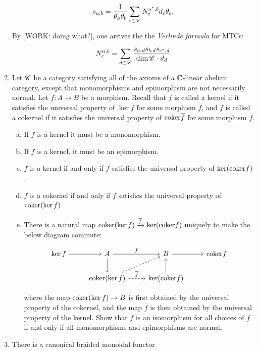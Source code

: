 \documentclass{article}
\theoremstyle{definition}
\numberwithin{figure}{section}
\begin{document}
\begin{enumerate}[\thesection .1.]
$$s_{a,b}=\frac{1}{\theta_a \theta_b}\sum_{c\in \mathscr{L}}N^{a^*,b}_{c}d_{c}\theta_{c}.$$

By [WORK: doing what?], one arrives the the \textit{Verlinde formula} for MTCs:

$$N^{a,b}_{c}=\sum_{d\in \mathscr{L}} \frac{s_{a,d} s_{b,d}s_{c^*,d}}{\dim{\mathscr{C}}\cdot d_d}$$

\item Let $\mathscr{C}$ be a category satisfying all of the axioms of a $\mathbb{C}$-linear abelian category, except that monomorphisms and epimorphism are not necessarily normal. Let $f:A\to B$ be a morphism. Recall that $f$ is called a kernel if it satisfies the universal property of $\ker \overline{f}$ for some morphism $\overline{f}$, and $f$ is called a cokernel if it satisfies the universal property of $\mathrm{coker} \overline{f}$ for some morphism $\overline{f}$.

\begin{enumerate}[(a)]
\item If $f$ is a kernel it must be a monomorphism.
\item If $f$ is a kernel, it must be an epimorphism.
\item $f$ is a kernel if and only if $f$ satisfies the universal property of $\ker(\mathrm{coker} f)$.
\item $f$ is a cokernel if and only if $f$ satisfies the universal property of $\mathrm{coker}(\ker f)$
\item There is a natural map $\mathrm{coker}(\ker f)\xrightarrow{\overline{f}} \ker(\mathrm{coker} f)$ uniquely to make the below diagram commute:

\[\begin{tikzcd}
	{\ker f} & A & B & {\coker f} \\
	& {\coker (\ker f)} & {\ker (\coker f)}
	\arrow[from=1-1, to=1-2]
	\arrow["f", from=1-2, to=1-3]
	\arrow[from=1-3, to=1-4]
	\arrow[from=1-2, to=2-2]
	\arrow[from=2-3, to=1-3]
	\arrow[dashed, from=2-2, to=1-3]
	\arrow["{\overline{f}}", dashed, from=2-2, to=2-3]
\end{tikzcd}\]

where the map $\mathrm{coker} (\ker f)\to B$ is first obtained by the universal property of the cokernel, and the map $\overline{f}$ is then obtained by the universal property of the kernel. Show that $\overline{f}$ is an isomorphism for all choices of $f$ if and only if all monomorphisms and epimorphisms are normal.
\end{enumerate}

\item There is a canonical braided monoidal functor


\end{enumerate}
\end{document}
